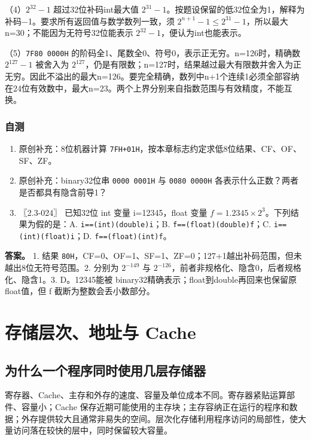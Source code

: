 （4）\(2^{32}-1\) 超过32位补码int最大值 \(2^{31}-1\)。按题设保留的低32位全为1，解释为补码−1。要求所有返回值与数学数列一致，须 \(2^{n+1}-1\le2^{31}-1\)，所以最大n=30；不能因为无符号32位能表示 \(2^{32}-1\)，便认为int也能表示。

（5）\texttt{7F80\ 0000H} 的阶码全1、尾数全0、符号0，表示正无穷。n=126时，精确数 \(2^{127}-1\) 被舍入为 \(2^{127}\)，仍是有限数；n=127时，结果越过最大有限数并舍入为正无穷。因此不溢出的最大n=126。要完全精确，数列中n+1个连续1必须全部容纳在24位有效数中，最大n=23。两个上界分别来自指数范围与有效精度，不能互换。

\subsection{自测}\label{co-self2}

\begin{enumerate}
\def\labelenumi{\arabic{enumi}.}
\tightlist
\item
  原创补充：8位机器计算 \texttt{7FH+01H}，按本章标志约定求低8位结果、CF、OF、SF、ZF。
\item
  原创补充：binary32位串 \texttt{0000\ 0001H} 与 \texttt{0080\ 0000H} 各表示什么正数？两者是否都具有隐含前导1？
\item
  〖2.3-024〗 已知32位 int 变量 i=12345，float 变量 \(f=1.2345\times2^3\)。下列结果为假的是：A. \texttt{i==(int)(double)i}；B. \texttt{f==(float)(double)f}；C. \texttt{i==(int)(float)i}；D. \texttt{f==(float)(int)f}。
\end{enumerate}

\textbf{答案。} 1. 结果 \texttt{80H}，CF=0、OF=1、SF=1、ZF=0；127+1越出补码范围，但未越出8位无符号范围。2. 分别为 \(2^{-149}\) 与 \(2^{-126}\)，前者非规格化、隐含0，后者规格化、隐含1。3. D。12345能被 binary32精确表示；float到double再回来也保留原float值，但 f 截断为整数会丢小数部分。

\chapter{存储层次、地址与 Cache}\label{co-ch3}

\section{为什么一个程序同时使用几层存储器}\label{co-03-01}

寄存器、Cache、主存和外存的速度、容量及单位成本不同。寄存器紧贴运算部件、容量小；Cache 保存近期可能使用的主存块；主存容纳正在运行的程序和数据；外存提供较大且通常非易失的空间。层次化存储利用程序访问的局部性，使大量访问落在较快的层中，同时保留较大容量。

